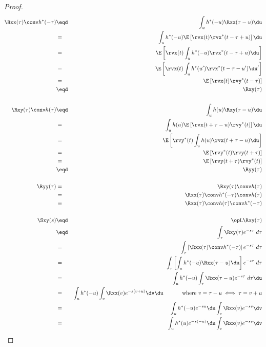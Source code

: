 \begin{proof}
\begin{eqnarray*}
   \Rxx(\tau) \conv h^\ast(-\tau)
     &\eqd& \int_u h^\ast(-u) \Rxx(\tau-u)\du
   \\&=&    \int_u h^\ast(-u) \E\left[\rvx(t) \rvx^\ast(t-\tau+u) \right] \du
   \\&=&    \E\left[\rvx(t) \int_u h^\ast(-u)  \rvx^\ast(t-\tau+u) \du   \right]
   \\&=&    \E\left[\rvx(t) \int_u h^\ast(u^\prime)  \rvx^\ast(t-\tau-u^\prime) \du^\prime   \right]
   \\&=&    \E\left[\rvx(t) \rvy^\ast(t-\tau)  \right]
   \\&\eqd& \Rxy(\tau)
\\
\\
   \Rxy(\tau) \conv h(\tau)
     &\eqd& \int_u h(u) \Rxy(\tau-u)\du
   \\&=&    \int_u h(u) \E\left[\rvx(t+\tau-u) \rvy^\ast(t) \right] \du
   \\&=&    \E\left[\rvy^\ast(t) \int_u h(u) \rvx(t+\tau-u)  \du \right]
   \\&=&    \E\left[\rvy^\ast(t) \rvy(t+\tau) \right]
   \\&=&    \E\left[ \rvy(t+\tau) \rvy^\ast(t)\right]
   \\&\eqd& \Ryy(\tau)
\\
\\
   \Ryy(\tau)
     &=& \Rxy(\tau) \conv h(\tau)
   \\&=& \Rxx(\tau) \conv h^\ast(-\tau) \conv h(\tau)
   \\&=& \Rxx(\tau) \conv h(\tau)  \conv h^\ast(-\tau)
\\
\\
  \Sxy(s)
     &\eqd& \opL \Rxy(\tau)
   \\&\eqd& \int_\tau \Rxy(\tau) e^{-s\tau} \; d\tau
   \\&=&    \int_\tau \left[ \Rxx(\tau) \conv h^\ast(-\tau) \right] e^{-s\tau} \; d\tau
   \\&=&    \int_\tau \left[ \int_u h^\ast(-u) \Rxx(\tau-u)\du \right] e^{-s\tau} \; d\tau
   \\&=&    \int_u h^\ast(-u) \int_\tau \Rxx(\tau-u)e^{-s\tau} \; d\tau\du
   \\&=&    \int_u h^\ast(-u) \int_v \Rxx(v)e^{-s(v+u)} \dv \du
            \hspace{3em}\mbox{ where $v=\tau-u\iff \tau=v+u$}
   \\&=&    \int_u h^\ast(-u) e^{-su} \du \int_v \Rxx(v)e^{-sv} \dv
   \\&=&    \int_u h^\ast(u) e^{-s(-u)} \du \int_v \Rxx(v)e^{-sv} \dv

\end{eqnarray*}
\end{proof}
